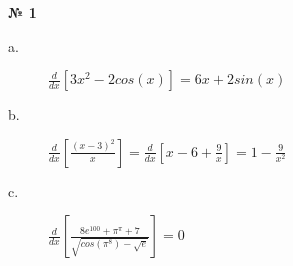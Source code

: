 \documentclass[12pt]{article}
\newenvironment{task}[1][0]{\vspace{.5cm} {\textbf{№ #1} \vspace{.5cm}\\ }\large}{}
\begin{document}
\vspace{1.5cm}
\begin{task}[1]
\begin{description}
	\item[a.] $\frac{d}{dx} \left[3x^2-2cos(x)\right]=6x+2sin(x)$
	\item[b.] $\frac{d}{dx} \left[\frac{(x-3)^2}{x}\right] = \frac{d}{dx} \left[x-6+\frac{9}{x}\right]=1-\frac{9}{x^2}$
	\item[c.] $\frac{d}{dx} \left[\frac{8e^{100}+\pi ^ {\pi} +7}{\sqrt{cos(\pi^8)-\sqrt{e}}}\right]=0$
\end{description}

\end{task}
\end{document}
